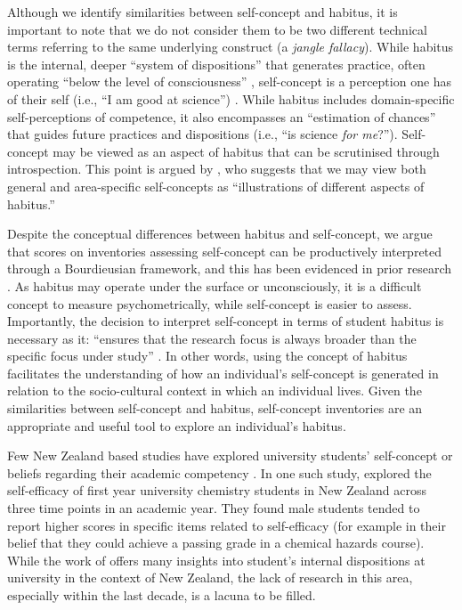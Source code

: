 Although we identify similarities between self-concept and habitus, it is important to note that we do not consider them to be two different technical terms referring to the same underlying construct (a \textit{jangle fallacy}). While habitus is the internal, deeper ``system of dispositions'' \cite[p.471]{Bourdieu1984} that generates practice, often operating ``below the level of consciousness'' \cite[p.466]{Bourdieu1984}, self-concept is a perception one has of their self (i.e., ``I am good at science'') . While habitus includes domain-specific self-perceptions of competence, it also encompasses an ``estimation of chances'' \citep[p.76]{bourdieu1977outline} that guides future practices and dispositions (i.e., ``is science \textit{for me}?''). Self-concept may be viewed as an aspect of habitus that can be scrutinised through introspection. This point is argued by \citet[p.395]{bodovski2014adolescents}, who suggests that we may view both general and area-specific self-concepts as ``illustrations of different aspects of habitus.'' 

Despite the conceptual differences between habitus and self-concept, we argue that scores on inventories assessing self-concept can be productively interpreted through a Bourdieusian framework, and this has been evidenced in prior research \citep{dumais2002cultural}. As habitus may operate under the surface or unconsciously, it is a difficult concept to measure psychometrically, while self-concept is easier to assess. Importantly, the decision to interpret self-concept in terms of student habitus is necessary as it: ``ensures that the research focus is always broader than the specific focus under study'' \citep{Reay_2004}. In other words, using the concept of habitus facilitates the understanding of how an individual's self-concept is generated in relation to the socio-cultural context in which an individual lives. Given the similarities between self-concept and habitus, self-concept inventories are an appropriate and useful tool to explore an individual's habitus. 

Few New Zealand based studies have explored university students' self-concept or beliefs regarding their academic competency \citep{dalgety2006exploring,murphy2018determinants}. In one such study, \cite{dalgety2006exploring} explored the self-efficacy of first year university chemistry students in New Zealand across three time points in an academic year. They found male students tended to report higher scores in specific items related to self-efficacy (for example in their belief that they could achieve a passing grade in a chemical hazards course). While the work of \cite{dalgety2006exploring} offers many insights into student's internal dispositions at university in the context of New Zealand, the lack of research in this area, especially within the last decade, is a lacuna to be filled. 

